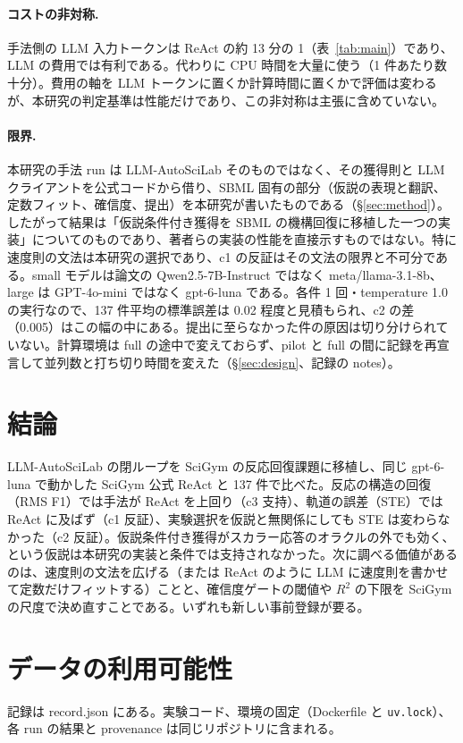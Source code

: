 \documentclass{article}
\providecommand{\unverified}[1]{#1}
\providecommand{\airasrecordlink}[1]{#1}
\begin{document}
\paragraph{コストの非対称.}
手法側の LLM 入力トークンは ReAct の約 \unverified{13} 分の 1（表~\ref{tab:main}）であり、LLM の費用では有利である。代わりに CPU 時間を大量に使う（1 件あたり数十分）。費用の軸を LLM トークンに置くか計算時間に置くかで評価は変わるが、本研究の判定基準は性能だけであり、この非対称は主張に含めていない。

\paragraph{限界.}
本研究の手法 run は LLM-AutoSciLab そのものではなく、その獲得則と LLM クライアントを公式コードから借り、SBML 固有の部分（仮説の表現と翻訳、定数フィット、確信度、提出）を本研究が書いたものである（§\ref{sec:method}）。したがって結果は「仮説条件付き獲得を SBML の機構回復に移植した一つの実装」についてのものであり、著者らの実装の性能を直接示すものではない。特に速度則の文法は本研究の選択であり、c1 の反証はその文法の限界と不可分である。small モデルは論文の Qwen2.5-7B-Instruct ではなく meta/llama-3.1-8b、large は GPT-4o-mini ではなく gpt-6-luna である。各件 1 回・temperature 1.0 の実行なので、137 件平均の標準誤差は 0.02 程度と見積もられ、c2 の差（0.005）はこの幅の中にある。提出に至らなかった件の原因は切り分けられていない。計算環境は full の途中で変えておらず、pilot と full の間に記録を再宣言して並列数と打ち切り時間を変えた（§\ref{sec:design}、記録の notes）。

\section{結論}
\label{sec:conclusion}
LLM-AutoSciLab の閉ループを SciGym の反応回復課題に移植し、同じ gpt-6-luna で動かした SciGym 公式 ReAct と 137 件で比べた。反応の構造の回復（RMS F1）では手法が ReAct を上回り（c3 支持）、軌道の誤差（STE）では ReAct に及ばず（c1 反証）、実験選択を仮説と無関係にしても STE は変わらなかった（c2 反証）。仮説条件付き獲得がスカラー応答のオラクルの外でも効く、という仮説は本研究の実装と条件では支持されなかった。次に調べる価値があるのは、速度則の文法を広げる（または ReAct のように LLM に速度則を書かせて定数だけフィットする）ことと、確信度ゲートの閾値や $R^2$ の下限を SciGym の尺度で決め直すことである。いずれも新しい事前登録が要る。

\section*{データの利用可能性}
記録は \airasrecordlink{record.json} にある。実験コード、環境の固定（Dockerfile と \texttt{uv.lock}）、各 run の結果と provenance は同じリポジトリに含まれる。



\end{document}
